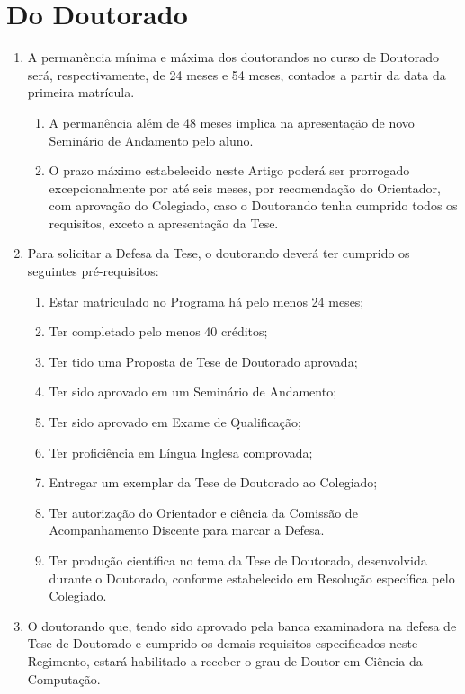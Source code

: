 \documentclass{article}
\newcommand{\grupoMenor}{Colegiado\xspace}
\begin{document}
\section{Do Doutorado}
\begin{enumerate}
	\item  A permanência mínima e máxima dos doutorandos no curso de Doutorado será, respectivamente, de 24 meses e 54 meses, contados a partir da data da primeira matrícula.
	\begin{enumerate}
		\item A permanência além de 48 meses implica na apresentação de novo Seminário de Andamento pelo aluno.	
		\item O prazo máximo estabelecido neste Artigo poderá ser prorrogado excepcionalmente por até seis meses, por recomendação do Orientador, com aprovação do \grupoMenor, caso o Doutorando tenha cumprido todos os requisitos, exceto a apresentação da Tese.
	\end{enumerate}
	
	\item Para solicitar a Defesa da Tese, o doutorando deverá ter cumprido os seguintes pré-requisitos:
	\begin{enumerate}[label=\Roman*]
		\item	Estar matriculado no Programa há pelo menos 24 meses;
		\item	Ter completado pelo menos 40 créditos;
		\item	Ter tido uma Proposta de Tese de Doutorado aprovada;
		\item	Ter sido aprovado em um Seminário de Andamento;
		\item	Ter sido aprovado em Exame de Qualificação;
		\item 	Ter proficiência em Língua Inglesa comprovada;
		\item	Entregar um exemplar da Tese de Doutorado ao \grupoMenor;
		\item	Ter autorização do Orientador e ciência da Comissão de Acompanhamento Discente para marcar a Defesa.
		\item	Ter produção científica no tema da Tese de Doutorado, desenvolvida durante o Doutorado, conforme estabelecido em Resolução específica pelo \grupoMenor.
	\end{enumerate}

	\item  O doutorando que, tendo sido aprovado pela banca examinadora na defesa de Tese de Doutorado e cumprido os demais requisitos especificados neste Regimento, estará habilitado a receber o grau de Doutor em Ciência da Computação.
\end{enumerate}
\end{document}
